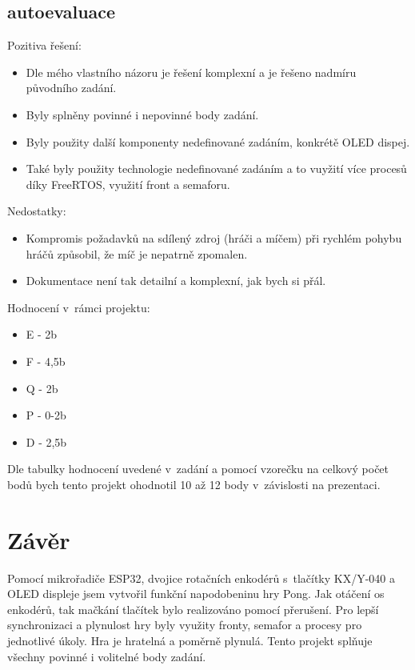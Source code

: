 \documentclass[a4paper,11pt]{article}
\begin{document}
\subsection{autoevaluace} \noindent
Pozitiva řešení:
\begin{itemize}
    \item{Dle mého vlastního názoru je řešení komplexní a je řešeno nadmíru původního zadání.}
    \item{Byly splněny povinné i nepovinné body zadání.}
    \item{Byly použity další komponenty nedefinované zadáním, konkrétě OLED dispej.}
    \item{Také byly použity technologie nedefinované zadáním a to vuyžití více procesů díky FreeRTOS, využití front a semaforu.}
\end{itemize}
\noindent
Nedostatky:
\begin{itemize}
    \item{Kompromis požadavků na sdílený zdroj (hráči a míčem) při rychlém pohybu hráčů způsobil, že míč je nepatrně zpomalen.}
    \item{Dokumentace není tak detailní a komplexní, jak bych si přál.}
\end{itemize}
\noindent
Hodnocení v~rámci projektu:
\begin{itemize}
    \item{E - 2b}
    \item{F - 4,5b}
    \item{Q - 2b}
    \item{P - 0-2b}
    \item{D - 2,5b}
\end{itemize}

Dle tabulky hodnocení uvedené v~zadání a pomocí vzorečku na celkový počet bodů bych tento projekt ohodnotil 10 až 12 body v~závislosti na prezentaci.

\section{Závěr}
Pomocí mikrořadiče ESP32, dvojice rotačních enkodérů s~tlačítky KX/Y-040 a OLED displeje jsem vytvořil funkční napodobeninu hry Pong.
Jak otáčení os enkodérů, tak mačkání tlačítek bylo realizováno pomocí přerušení. 
Pro lepší synchronizaci a plynulost hry byly využity fronty, semafor a procesy pro jednotlivé úkoly.
Hra je hratelná a poměrně plynulá.
Tento projekt splňuje všechny povinné i volitelné body zadání.
\end{document}
